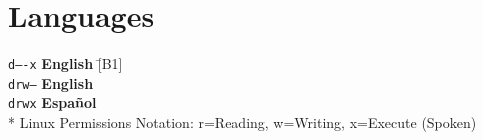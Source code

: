 \documentclass[11pt,a4paper,sans]{moderncv}
\newcommand{\sectionMargin}{-3mm}
\begin{document}
\vspace*{\sectionMargin}
\section{Languages}
\begin{tabbing}
  \texttt{d----x} \hspace{1mm}\= \textbf{English} \hspace{1mm}\= [B1] \\
  \texttt{drw--} \> \textbf{English} \> [Technical] \\
  \texttt{drwx} \> \textbf{Español} \> [Native] \\
  \** Linux Permissions Notation: r=Reading, w=Writing, x=Execute (Spoken)
\end{tabbing}
\end{document}
